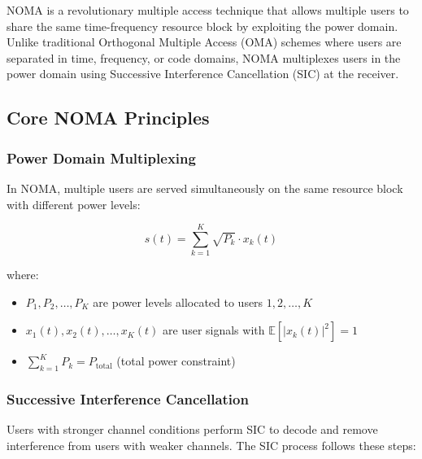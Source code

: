 \documentclass[11pt,a4paper]{article}
\begin{document}
NOMA is a revolutionary multiple access technique that allows multiple users to share the same time-frequency resource block by exploiting the power domain. Unlike traditional Orthogonal Multiple Access (OMA) schemes where users are separated in time, frequency, or code domains, NOMA multiplexes users in the power domain using Successive Interference Cancellation (SIC) at the receiver.

\subsection{Core NOMA Principles}

\subsubsection{Power Domain Multiplexing}

In NOMA, multiple users are served simultaneously on the same resource block with different power levels:

\begin{equation}
s(t) = \sum_{k=1}^{K} \sqrt{P_k} \cdot x_k(t)
\end{equation}

where:
\begin{itemize}
    \item $P_1, P_2, \ldots, P_K$ are power levels allocated to users $1, 2, \ldots, K$
    \item $x_1(t), x_2(t), \ldots, x_K(t)$ are user signals with $\mathbb{E}[|x_k(t)|^2] = 1$
    \item $\sum_{k=1}^{K} P_k = P_{\text{total}}$ (total power constraint)
\end{itemize}

\subsubsection{Successive Interference Cancellation}

Users with stronger channel conditions perform SIC to decode and remove interference from users with weaker channels. The SIC process follows these steps:
\end{document}
